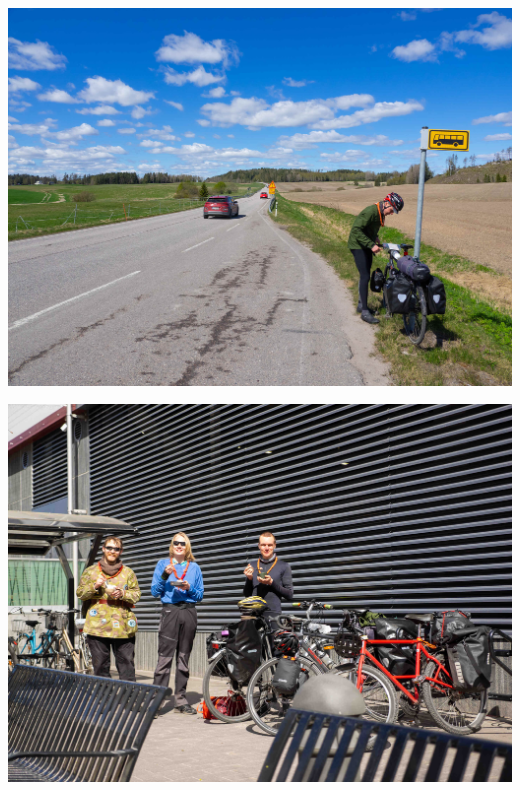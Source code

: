 \begin{Figure}
\begin{center}
	\noindent\includegraphics[width=0.90\linewidth]{assets/pyörävaellus8}
\end{center}
\end{Figure}
\begin{Figure}
\begin{center}
	\noindent\includegraphics[width=0.90\linewidth]{assets/pyörävaellus9}
\end{center}
\end{Figure}


